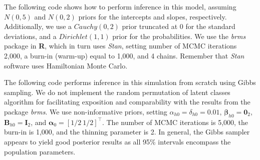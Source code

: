 The following code shows how to perform inference in this model, assuming $N(0,5)$ and $N(0,2)$ priors for the intercepts and slopes, respectively. Additionally, we use a $Cauchy(0,2)$ prior truncated at 0 for the standard deviations, and a $Dirichlet(1,1)$ prior for the probabilities. We use the \textit{brms} package in \textbf{R}, which in turn uses \textit{Stan}, setting number of MCMC iterations 2,000, a burn-in (warm-up) equal to 1,000, and 4 chains. Remember that \textit{Stan} software uses Hamiltonian Monte Carlo.

The following code performs inference in this simulation from scratch using Gibbs sampling. We do not implement the random permutation of latent classes algorithm for facilitating exposition and comparability with the results from the package \textit{brms}. We use non-informative priors, setting $\alpha_{h0}=\delta_{h0}=0.01$, $\bm{\beta}_{h0}=\bm{0}_2$, $\bm{B}_{h0}=\bm{I}_2$, and $\bm{\alpha}_0=[1/2 \ 1/2]^{\top}$. The number of MCMC iterations is 5,000, the burn-in is 1,000, and the thinning parameter is 2. In general, the Gibbs sampler appears to yield good posterior results as all 95\% intervals encompass the population parameters. 

